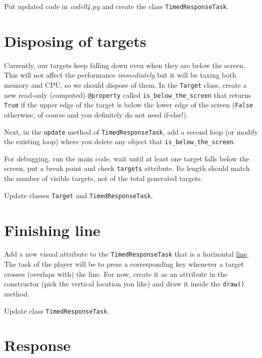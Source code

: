 \documentclass[
]{book}
\begin{document}
Put updated code in \emph{code04.py} and create the class \texttt{TimedResponseTask}.

\hypertarget{disposing-of-targets}{%
\section{Disposing of targets}\label{disposing-of-targets}}

Currently, our targets keep falling down even when they are below the screen. This will not affect the performance \emph{immediately} but it will be taxing both memory and CPU, so we should dispose of them. In the \texttt{Target} class, create a new read-only (computed) \texttt{@property} called \texttt{is\_below\_the\_screen} that returns \texttt{True} if the upper edge of the target is below the lower edge of the screen (\texttt{False} otherwise, of course and you definitely do not need if-else!).

Next, in the \texttt{update} method of \texttt{TimedResponseTask}, add a second loop (or modify the existing loop) where you delete any object that \texttt{is\_below\_the\_screen}.

For debugging, run the main code, wait until at least one target falls below the screen, put a break point and check \texttt{targets} attribute. Its length should match the number of visible targets, not of the total generated targets.

Update classes \texttt{Target} and \texttt{TimedResponseTask}.

\hypertarget{finishing-line}{%
\section{Finishing line}\label{finishing-line}}

Add a new visual attribute to the \texttt{TimedResponseTask} that is a horizontal \href{https://psychopy.org/api/visual/line.html\#psychopy.visual.Line}{line}. The task of the player will be to press a corresponding key whenever a target crosses (overlaps with) the line. For now, create it as an attribute in the constructor (pick the vertical location you like) and draw it inside the \texttt{draw()} method.

Update class \texttt{TimedResponseTask}.

\hypertarget{response}{%
\section{Response}\label{response}}
\end{document}
